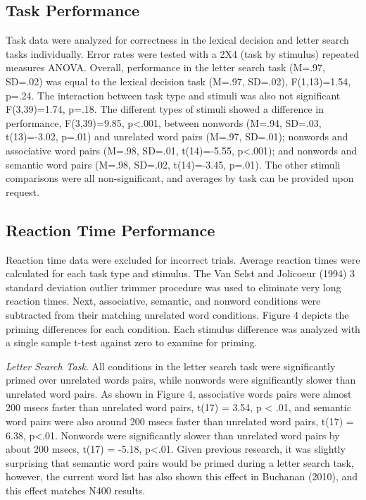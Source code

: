 \documentclass[english,man]{apa6}
\theoremstyle{definition}
\theoremstyle{definition}
\theoremstyle{remark}
\begin{document}
\subsection{Task Performance}\label{task-performance}

Task data were analyzed for correctness in the lexical decision and
letter search tasks individually. Error rates were tested with a 2X4
(task by stimulus) repeated measures ANOVA. Overall, performance in the
letter search task (M=.97, SD=.02) was equal to the lexical decision
task (M=.97, SD=.02), F(1,13)=1.54, p=.24. The interaction between task
type and stimuli was also not significant F(3,39)=1.74, p=.18. The
different types of stimuli showed a difference in performance,
F(3,39)=9.85, p\textless{}.001, between nonwords (M=.94, SD=.03,
t(13)=-3.02, p=.01) and unrelated word pairs (M=.97, SD=.01); nonwords
and associative word pairs (M=.98, SD=.01, t(14)=-5.55,
p\textless{}.001); and nonwords and semantic word pairs (M=.98, SD=.02,
t(14)=-3.45, p=.01). The other stimuli comparisons were all
non-significant, and averages by task can be provided upon request.

\subsection{Reaction Time Performance}\label{reaction-time-performance}

Reaction time data were excluded for incorrect trials. Average reaction
times were calculated for each task type and stimulus. The Van Selst and
Jolicoeur (1994) 3 standard deviation outlier trimmer procedure was used
to eliminate very long reaction times. Next, associative, semantic, and
nonword conditions were subtracted from their matching unrelated word
conditions. Figure 4 depicts the priming differences for each condition.
Each stimulus difference was analyzed with a single sample t-test
against zero to examine for priming.

\emph{Letter Search Task}. All conditions in the letter search task were
significantly primed over unrelated words pairs, while nonwords were
significantly slower than unrelated word pairs. As shown in Figure 4,
associative words pairs were almost 200 msecs faster than unrelated word
pairs, t(17) = 3.54, p \textless{} .01, and semantic word pairs were
also around 200 msecs faster than unrelated word pairs, t(17) = 6.38,
p\textless{}.01. Nonwords were significantly slower than unrelated word
pairs by about 200 msecs, t(17) = -5.18, p\textless{}.01. Given previous
research, it was slightly surprising that semantic word pairs would be
primed during a letter search task, however, the current word list has
also shown this effect in Buchanan (2010), and this effect matches N400
results.
\end{document}
